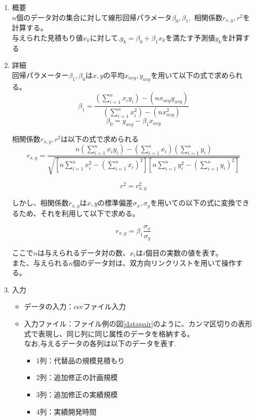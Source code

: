 \documentclass[titlepage,a4paper,12pt]{ltjsreport}
\begin{document}

\begin{enumerate}
    \item 概要 \mbox{}\\
    $n$個のデータ対の集合に対して線形回帰パラメータ$\beta_0, \beta_1,$ 相関係数$r_{x,y}, r^2$を計算する。\\
    与えられた見積もり値$x_k$に対して,$y_k = \beta_0 + \beta_1x_k$を満たす予測値$y_k$を計算する

    \item 詳細\mbox{}\\
    回帰パラメーター$\beta_1,\beta_0$は$x,y$の平均$x_{avg},y_{avg}$を用いて以下の式で求められる。
    \[\beta_1 = \frac{(\sum_{i=1}^{n}x_iy_i) - (nx_{avg}y_{avg})}{(\sum_{i=1}^{n}x_i^2) - (nx_{avg}^2)}\]
    \[\beta_0 = y_{avg} - \beta_1x_{avg}\]

    相関係数$r_{x,y}, r^2$は以下の式で求められる
    \[
    r_{x,y} = \frac{n (\sum_{i=1}^{n} x_i y_i) - (\sum_{i=1}^{n} x_i) (\sum_{i=1}^{n} y_i)}
    {\sqrt{\left[n \sum_{i=1}^{n} x_i^2 - (\sum_{i=1}^{n} x_i)^2\right]
    \left[n \sum_{i=1}^{n} y_i^2 - (\sum_{i=1}^{n} y_i)^2\right]}}
    \]

    \[r^2 = r_{x,y}^2\]

    しかし、相関係数$r_{x,y}$は$x,y$の標準偏差$\sigma_x,\sigma_y$を用いての以下の式に変換できるため、それを利用して以下で求める。

    \[r_{x,y} = \beta_1\frac{\sigma_x}{\sigma_y}\]

    
    ここで$n$は与えられるデータ対の数、$x_i$は$i$個目の実数の値を表す。\\
    また、与えられる$n$個のデータ対は、双方向リンクリストを用いて操作する。


    \item 入力\mbox{}\\
    
    \begin{itemize}
        \item データの入力：csvファイル入力
        \item 入力ファイル：ファイル例の図\ref{datapair}のように、カンマ区切りの表形式で表現し、同じ列に同じ属性のデータを格納する。\\
        
        なお,与えるデータの各列は以下のデータを表す.
        \begin{itemize}
            \item 1列：代替品の規模見積もり
            \item 2列：追加修正の計画規模
            \item 3列：追加修正の実績規模
            \item 4列：実績開発時間
        \end{itemize}
        

\end{itemize}
\end{enumerate}
\end{document}

